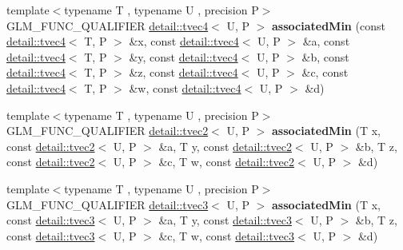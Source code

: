 \begin{DoxyCompactItemize}
\item 
{\footnotesize template$<$typename T , typename U , precision P$>$ }\\G\+L\+M\+\_\+\+F\+U\+N\+C\+\_\+\+Q\+U\+A\+L\+I\+F\+I\+ER \hyperlink{structglm_1_1detail_1_1tvec4}{detail\+::tvec4}$<$ U, P $>$ {\bfseries associated\+Min} (const \hyperlink{structglm_1_1detail_1_1tvec4}{detail\+::tvec4}$<$ T, P $>$ \&x, const \hyperlink{structglm_1_1detail_1_1tvec4}{detail\+::tvec4}$<$ U, P $>$ \&a, const \hyperlink{structglm_1_1detail_1_1tvec4}{detail\+::tvec4}$<$ T, P $>$ \&y, const \hyperlink{structglm_1_1detail_1_1tvec4}{detail\+::tvec4}$<$ U, P $>$ \&b, const \hyperlink{structglm_1_1detail_1_1tvec4}{detail\+::tvec4}$<$ T, P $>$ \&z, const \hyperlink{structglm_1_1detail_1_1tvec4}{detail\+::tvec4}$<$ U, P $>$ \&c, const \hyperlink{structglm_1_1detail_1_1tvec4}{detail\+::tvec4}$<$ T, P $>$ \&w, const \hyperlink{structglm_1_1detail_1_1tvec4}{detail\+::tvec4}$<$ U, P $>$ \&d)\hypertarget{namespaceglm_a1c1dfb0ea33d7ecc9119cd528438a64c}{}\label{namespaceglm_a1c1dfb0ea33d7ecc9119cd528438a64c}

\item 
{\footnotesize template$<$typename T , typename U , precision P$>$ }\\G\+L\+M\+\_\+\+F\+U\+N\+C\+\_\+\+Q\+U\+A\+L\+I\+F\+I\+ER \hyperlink{structglm_1_1detail_1_1tvec2}{detail\+::tvec2}$<$ U, P $>$ {\bfseries associated\+Min} (T x, const \hyperlink{structglm_1_1detail_1_1tvec2}{detail\+::tvec2}$<$ U, P $>$ \&a, T y, const \hyperlink{structglm_1_1detail_1_1tvec2}{detail\+::tvec2}$<$ U, P $>$ \&b, T z, const \hyperlink{structglm_1_1detail_1_1tvec2}{detail\+::tvec2}$<$ U, P $>$ \&c, T w, const \hyperlink{structglm_1_1detail_1_1tvec2}{detail\+::tvec2}$<$ U, P $>$ \&d)\hypertarget{namespaceglm_a748b6d48ac3eee9b1fbf6c13bea30967}{}\label{namespaceglm_a748b6d48ac3eee9b1fbf6c13bea30967}

\item 
{\footnotesize template$<$typename T , typename U , precision P$>$ }\\G\+L\+M\+\_\+\+F\+U\+N\+C\+\_\+\+Q\+U\+A\+L\+I\+F\+I\+ER \hyperlink{structglm_1_1detail_1_1tvec3}{detail\+::tvec3}$<$ U, P $>$ {\bfseries associated\+Min} (T x, const \hyperlink{structglm_1_1detail_1_1tvec3}{detail\+::tvec3}$<$ U, P $>$ \&a, T y, const \hyperlink{structglm_1_1detail_1_1tvec3}{detail\+::tvec3}$<$ U, P $>$ \&b, T z, const \hyperlink{structglm_1_1detail_1_1tvec3}{detail\+::tvec3}$<$ U, P $>$ \&c, T w, const \hyperlink{structglm_1_1detail_1_1tvec3}{detail\+::tvec3}$<$ U, P $>$ \&d)\hypertarget{namespaceglm_a8c91e3eddf5a5aa17cad12b291acccd6}{}\label{namespaceglm_a8c91e3eddf5a5aa17cad12b291acccd6}


\end{DoxyCompactItemize}
